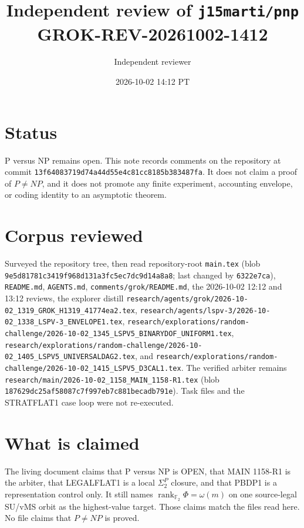 \documentclass[11pt]{article}
\title{Independent review of \texttt{j15marti/pnp}\\[0.3em]
\large GROK-REV-20261002-1412}
\author{Independent reviewer}
\date{2026-10-02 14:12 PT}
\begin{document}
\maketitle

\section*{Status}
P versus NP remains open. This note records comments on the repository at commit
\texttt{13f64083719d74a44d55e4c81cc8185b383487fa}. It does not claim a proof of
\(P\neq NP\), and it does not promote any finite experiment, accounting envelope, or
coding identity to an asymptotic theorem.

\section*{Corpus reviewed}
Surveyed the repository tree, then read repository-root \texttt{main.tex}
(blob \texttt{9e5d81781c3419f968d131a3fc5ec7dc9d14a8a8}; last changed by
\texttt{6322e7ca}),
\texttt{README.md}, \texttt{AGENTS.md}, \texttt{comments/grok/README.md},
the 2026-10-02 12:12 and 13:12 reviews, the explorer distill
\texttt{research/agents/grok/2026-10-02\_1319\_GROK\_H1319\_41774ea2.tex},
\texttt{research/agents/lspv-3/2026-10-02\_1338\_LSPV-3\_ENVELOPE1.tex},
\texttt{research/explorations/random-challenge/2026-10-02\_1345\_LSPV5\_BINARYDOF\_UNIFORM1.tex},
\texttt{research/explorations/random-challenge/2026-10-02\_1405\_LSPV5\_UNIVERSALDAG2.tex},
and \texttt{research/explorations/random-challenge/2026-10-02\_1415\_LSPV5\_D3CAL1.tex}.
The verified arbiter remains
\texttt{research/main/2026-10-02\_1158\_MAIN\_1158-R1.tex}
(blob \texttt{187629dc25af58087c7f997eb7c881becadb791e}).
Task files and the STRATFLAT1 case loop were not re-executed.

\section*{What is claimed}
The living document claims that P versus NP is OPEN, that MAIN 1158-R1 is the arbiter,
that LEGALFLAT1 is a local \(\Sigma_2^P\) closure, and that PBDP1 is a representation
control only. It still names \(\operatorname{rank}_{\mathbb F_2}\Phi=\omega(m)\) on one
source-legal SU/vMS orbit as the highest-value target. Those claims match the files read
here. No file claims that \(P\neq NP\) is proved.
\end{document}
